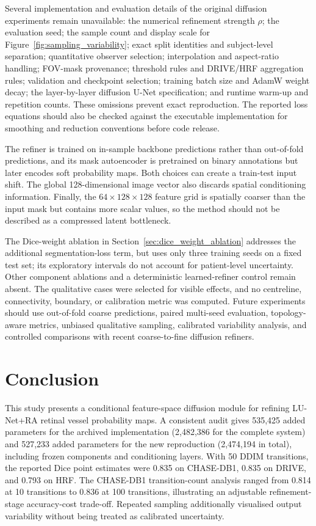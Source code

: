 \documentclass[jimaging,article,submit,pdftex,moreauthors]
  {Definitions/mdpi}
\begin{document}
Several implementation and evaluation details of the original diffusion experiments remain unavailable: the numerical refinement strength $\rho$; the evaluation seed; the sample count and display scale for Figure~\ref{fig:sampling_variability}; exact split identities and subject-level separation; quantitative observer selection; interpolation and aspect-ratio handling; FOV-mask provenance; threshold rules and DRIVE/HRF aggregation rules; validation and checkpoint selection; training batch size and AdamW weight decay; the layer-by-layer diffusion U-Net specification; and runtime warm-up and repetition counts. These omissions prevent exact reproduction. The reported loss equations should also be checked against the executable implementation for smoothing and reduction conventions before code release.

The refiner is trained on in-sample backbone predictions rather than out-of-fold predictions, and its mask autoencoder is pretrained on binary annotations but later encodes soft probability maps. Both choices can create a train-test input shift. The global 128-dimensional image vector also discards spatial conditioning information. Finally, the $64\times128\times128$ feature grid is spatially coarser than the input mask but contains more scalar values, so the method should not be described as a compressed latent bottleneck.

The Dice-weight ablation in Section~\ref{sec:dice_weight_ablation} addresses the additional segmentation-loss term, but uses only three training seeds on a fixed test set; its exploratory intervals do not account for patient-level uncertainty. Other component ablations and a deterministic learned-refiner control remain absent. The qualitative cases were selected for visible effects, and no centreline, connectivity, boundary, or calibration metric was computed. Future experiments should use out-of-fold coarse predictions, paired multi-seed evaluation, topology-aware metrics, unbiased qualitative sampling, calibrated variability analysis, and controlled comparisons with recent coarse-to-fine diffusion refiners.



\section{Conclusion}
\label{sec:conclusion}

This study presents a conditional feature-space diffusion module for refining LU-Net+RA retinal vessel probability maps. A consistent audit gives 535,425 added parameters for the archived implementation (2,482,386 for the complete system) and 527,233 added parameters for the new reproduction (2,474,194 in total), including frozen components and conditioning layers. With 50 DDIM transitions, the reported Dice point estimates were 0.835 on CHASE-DB1, 0.835 on DRIVE, and 0.793 on HRF. The CHASE-DB1 transition-count analysis ranged from 0.814 at 10 transitions to 0.836 at 100 transitions, illustrating an adjustable refinement-stage accuracy-cost trade-off. Repeated sampling additionally visualised output variability without being treated as calibrated uncertainty.
\end{document}
